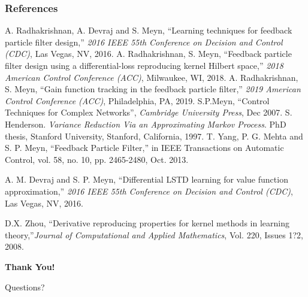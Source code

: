 \documentclass[xcolor=dvipsnames, subsection=false]{beamer}
\def\alertb#1{\alert{\color{BrickRed}  #1}}
\def\alertb#1{\alert{\color{BrickRed}  #1}}
\begin{document}
%	
%	
%	

\begin{frame}
\frametitle{References}

\begin{thebibliography}{10}
	\tiny
	A. Radhakrishnan, A. Devraj and S. Meyn, ``Learning techniques for feedback particle filter design,'' \textit{ 2016 IEEE 55th Conference on Decision and Control (CDC)}, Las Vegas, NV, 2016.
	A. Radhakrishnan, S. Meyn, ``Feedback particle filter design using a differential-loss reproducing kernel Hilbert space,'' \textit{2018 American Control Conference (ACC)}, Milwaukee, WI, 2018.
	A. Radhakrishnan, S. Meyn, ``Gain function tracking in the feedback particle filter,'' \textit{2019 American Control Conference (ACC)}, Philadelphia, PA, 2019.
	S.P.Meyn, ``Control Techniques for Complex Networks'', \textit{Cambridge University Press}, Dec 2007.
	S. Henderson. \textit{Variance Reduction Via an Approximating Markov Process}. PhD thesis, Stanford University, Stanford, California, 1997.
	T. Yang, P. G. Mehta and S. P. Meyn, ``Feedback Particle Filter,'' in IEEE Transactions on Automatic Control, vol. 58, no. 10, pp. 2465-2480, Oct. 2013.
	
	A. M. Devraj and S. P. Meyn, ``Differential LSTD learning for value function approximation,'' \textit{2016 IEEE 55th Conference on Decision and Control (CDC)}, Las Vegas, NV, 2016.
	
	D.X. Zhou,
``Derivative reproducing properties for kernel methods in learning theory,''\textit{Journal of Computational and Applied Mathematics},
 Vol. 220, Issues 1?2,
	2008.
	
\end{thebibliography}
\end{frame}



\begin{frame}
\centerline{\bf \huge \color{OrangeRed} Thank You!}
\vfill
\centerline{\huge \alertb{Questions?}}
\vfill
\end{frame}
\end{document}

